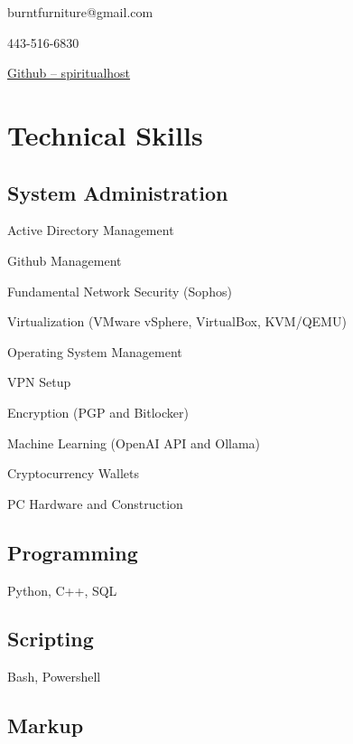 \documentclass{article}
\makeatletter
\renewcommand{\maketitle}{
	\begin{center}
		{\huge\bfseries\theauthor}
		
		\vspace{.5em}

		burntfurniture@gmail.com

		443-516-6830

		\href{https://github.com/spiritualhost}{Github -- spiritualhost}
	\end{center}
}
\makeatother
\begin{document}
\noindent

\author{Ryan Piazza}

\maketitle

\section{Technical Skills}

\subsection{System Administration}
\vspace{-1em} %

\begin{multicols}{2}
	\begin{compactitem}
		\item Active Directory Management
		\item Github Management
		\item Fundamental Network Security (Sophos)
		\item Virtualization (VMware vSphere, VirtualBox, KVM/QEMU)
		\item Operating System Management
		\item VPN Setup
		\item Encryption (PGP and Bitlocker)
		\item Machine Learning (OpenAI API and Ollama)
		\item Cryptocurrency Wallets
		\item PC Hardware and Construction
	\end{compactitem}
\end{multicols}

\subsection{Programming}

Python, C++, SQL

\subsection{Scripting} 

Bash, Powershell

\subsection{Markup}
\end{document}
